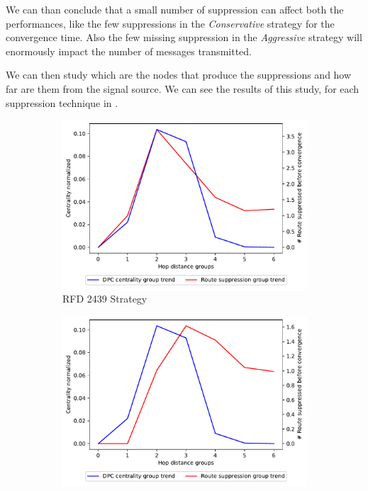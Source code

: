 We can than conclude that a small number of suppression can affect both the 
performances, like the few suppressions in the \textit{Conservative} strategy
for the convergence time.
Also the few missing suppression in the \textit{Aggressive} strategy will
enormously impact the number of messages transmitted.

We can then study which are the nodes that produce the suppressions and how
far are them from the signal source.
We can see the results of this study, for each suppression technique in .

\begin{figure}[h]
     \centering
     \begin{subfigure}[b]{0.325\textwidth}
         \centering
         \includegraphics[width=\textwidth]{images/RFD/miceVSelephants/mice/cisco_1000_RFD_nodeConvergence_centVSsup_trend.pdf}
         \caption{RFD 2439 Strategy}
         \label{fig:1000_2439RFD_centVSsup}
     \end{subfigure}
     \hfill
     \begin{subfigure}[b]{0.325\textwidth}
         \centering
         \includegraphics[width=\textwidth]{images/RFD/miceVSelephants/mice/cisco_1000_RFD_7196_aggressive_nodeConvergence_centVSsup_trend.pdf}

\end{subfigure}
\end{figure}
